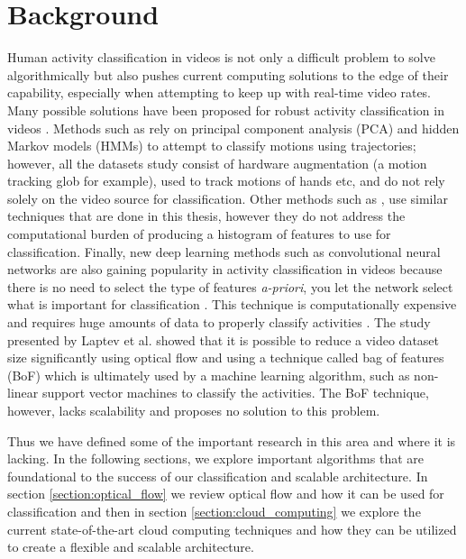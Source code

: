 \chapter{Background}
Human activity classification in videos is not only a difficult problem to solve
algorithmically but also pushes current computing solutions to the edge of their
capability, especially when attempting to keep up with real-time video rates.
Many possible solutions have been proposed for robust activity classification in
videos \cite{niebles2010modeling} \cite{bashir2007object}
\cite{ribeiro2005human} \cite{karpathy2014large}. Methods such as
\cite{bashir2007object} rely on principal component analysis (PCA) and hidden
Markov models (HMMs) to attempt to classify motions using trajectories; however,
all the datasets study consist of hardware augmentation (a motion tracking glob for
example), used to track motions of hands etc, and do not rely solely on the
video source for classification. Other methods such as
\cite{niebles2010modeling}, use similar techniques that are done in this thesis,
however they do not address the computational burden of producing a histogram of
features to use for classification. Finally, new deep learning methods such as
convolutional neural networks are also gaining popularity in activity
classification in videos because there is no need to select the type of features
\textit{a-priori}, you let the network select what is important for
classification \cite{karpathy2014large}. This technique is computationally
expensive and requires huge amounts of data to properly classify activities
\cite{karpathy2014large}. The study presented by Laptev et al.
\cite{laptev2008learning} showed that it is possible to reduce a video dataset
size significantly using optical flow and using a technique called bag of
features (BoF) which is ultimately used by a machine learning algorithm, such as
non-linear support vector machines to classify the activities. The BoF
technique, however, lacks scalability and proposes no solution to this problem.

Thus we have defined some of the important research in this area and where it is
lacking. In the following sections, we explore important algorithms that are
foundational to the success of our classification and scalable architecture. In
section \ref{section:optical_flow} we review optical flow and how it can be used
for classification and then in section \ref{section:cloud_computing} we explore
the current state-of-the-art cloud computing techniques and how they can be
utilized to create a flexible and scalable architecture.


